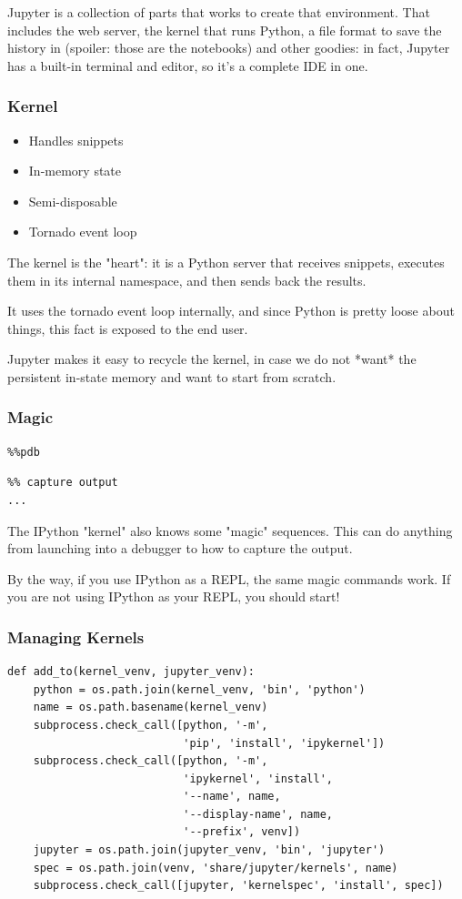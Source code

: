 Jupyter is a collection of parts that works to create that environment.
That includes the web server,
the kernel that runs Python,
a file format to save the history in
(spoiler: those are the notebooks)
and other goodies:
in fact,
Jupyter has a built-in terminal and editor,
so it's a complete IDE in one.

\begin{frame}
\frametitle{Kernel}

\begin{itemize}
\item Handles snippets
\item In-memory state
\item Semi-disposable
\item Tornado event loop
\end{itemize}

\end{frame}

The kernel is the "heart":
it is a Python server
that receives snippets,
executes them in its internal namespace,
and then sends back the results.

It uses the tornado event loop internally,
and since Python is pretty loose about things,
this fact is exposed to the end user.

Jupyter makes it easy to recycle the kernel,
in case we do not *want* the persistent
in-state memory
and want to start from scratch.

\begin{frame}[fragile]
\frametitle{Magic}

\begin{lstlisting}
%%pdb
\end{lstlisting}

\begin{lstlisting}
%% capture output
...
\end{lstlisting}

\end{frame}

The IPython "kernel" also knows some "magic" sequences.
This can do anything from launching into a debugger
to how to capture the output.

By the way,
if you use IPython as a REPL,
the same magic commands work.
If you are not using IPython as your REPL,
you should start!

\begin{frame}[fragile]
\frametitle{Managing Kernels}

\begin{lstlisting}
def add_to(kernel_venv, jupyter_venv):
    python = os.path.join(kernel_venv, 'bin', 'python')
    name = os.path.basename(kernel_venv)
    subprocess.check_call([python, '-m',
                           'pip', 'install', 'ipykernel'])
    subprocess.check_call([python, '-m',
                           'ipykernel', 'install',
                           '--name', name,
                           '--display-name', name,
                           '--prefix', venv])
    jupyter = os.path.join(jupyter_venv, 'bin', 'jupyter')
    spec = os.path.join(venv, 'share/jupyter/kernels', name)
    subprocess.check_call([jupyter, 'kernelspec', 'install', spec])
\end{lstlisting}
\end{frame}

